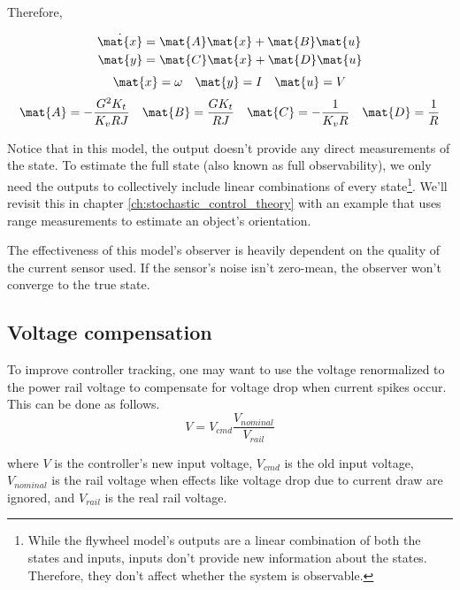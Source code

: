 Therefore,
\begin{theorem}
  \begin{align*}
    \dot{\mat{x}} &= \mat{A} \mat{x} + \mat{B} \mat{u} \\
    \mat{y} &= \mat{C} \mat{x} + \mat{D} \mat{u}
  \end{align*}
  \begin{equation*}
    \mat{x} = \omega
    \quad
    \mat{y} = I
    \quad
    \mat{u} = V
  \end{equation*}
  \begin{equation}
    \mat{A} = -\frac{G^2 K_t}{K_v RJ}
    \quad
    \mat{B} = \frac{G K_t}{RJ}
    \quad
    \mat{C} = -\frac{1}{K_v R}
    \quad
    \mat{D} = \frac{1}{R}
  \end{equation}
\end{theorem}

Notice that in this \gls{model}, the \gls{output} doesn't provide any direct
measurements of the \gls{state}. To estimate the full \gls{state} (also known as
full observability), we only need the \glspl{output} to collectively include
linear combinations of every \gls{state}\footnote{While the flywheel model's
outputs are a linear combination of both the states and inputs, \glspl{input}
don't provide new information about the \glspl{state}. Therefore, they don't
affect whether the system is observable.}. We'll revisit this in chapter
\ref{ch:stochastic_control_theory} with an example that uses range measurements
to estimate an object's orientation.

The effectiveness of this \gls{model}'s \gls{observer} is heavily dependent on
the quality of the current sensor used. If the sensor's noise isn't zero-mean,
the \gls{observer} won't converge to the true \gls{state}.

\subsection{Voltage compensation}

To improve controller \gls{tracking}, one may want to use the voltage
renormalized to the power rail voltage to compensate for voltage drop when
current spikes occur. This can be done as follows.
\begin{equation}
  V = V_{cmd} \frac{V_{nominal}}{V_{rail}}
\end{equation}

where $V$ is the \gls{controller}'s new input voltage, $V_{cmd}$ is the old
input voltage, $V_{nominal}$ is the rail voltage when effects like voltage drop
due to current draw are ignored, and $V_{rail}$ is the real rail voltage.

